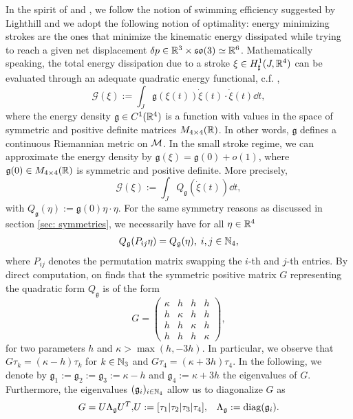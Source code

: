 \label{sec: optimization}
In the spirit of \cite{Alouges2013} and \cite{Alouges2017}, we follow the notion of swimming efficiency suggested by Lighthill \cite{Lighthill1952} and we adopt the following notion of optimality: energy minimizing strokes are the ones that minimize the kinematic energy dissipated while trying to reach a given net displacement $\delta p \in \mathbb{R}^3 \times \mathfrak{so}(3) \simeq \mathbb{R}^6$. Mathematically speaking, the total energy dissipation due to a stroke $\xi \in H^1_{\sharp}(J, \mathbb{R}^4)$ can be evaluated through an adequate quadratic energy functional, c.f. \cite{Alouges2013},
\begin{equation}
 \mathcal{G}(\xi) := \int_{J} \mathfrak{g}(\xi(t))\dot{\xi}(t) \cdot \dot{\xi}(t) \dd t,
\end{equation}
where the energy density $\mathfrak{g} \in C^1(\mathbb{R}^4)$ is a function with values in the space of symmetric and positive definite matrices $M_{4 \times 4}(\mathbb{R})$. In other words, $\mathfrak{g}$ defines a continuous Riemannian metric on $\mathcal{M}$. In the small stroke regime, we can approximate the energy density by $\mathfrak{g}(\xi) = \mathfrak{g}(0) + o(1)$, where $\mathfrak{g}(0) \in M_{4 \times 4}(\mathbb{R})$ is symmetric and positive definite. More precisely,
\begin{equation}
\label{eq: linearized energy functional}
	\mathcal{G}(\xi) := \int_{J} Q_{\mathfrak{g}}(\dot{\xi}(t))\dd t,
\end{equation}
with $Q_{\mathfrak{g}}(\eta) := \mathfrak{g}(0)\eta \cdot \eta$. For the same symmetry reasons as discussed in section \ref{sec: symmetries}, we necessarily have for all $\eta \in \mathbb{R}^4$
\begin{align}
	Q_{\mathfrak{g}}(P_{ij} \eta) = Q_{\mathfrak{g}}(\eta),\; i,j \in \mathbb{N}_4,
\end{align}
where $P_{ij}$ denotes the permutation matrix swapping the $i$-th and $j$-th entries. By direct computation, on finds that the symmetric positive matrix $G$ representing the quadratic form $Q_{\mathfrak{g}}$ is of the form
\begin{equation}
G = \left ( \begin{array}{cccc}
\kappa & h & h & h \\ 
h & \kappa & h & h \\ 
h & h & \kappa & h \\ 
h & h & h & \kappa
\end{array} \right ),
\end{equation}
for two parameters $h$ and $\kappa > \max(h, -3h)$. In particular, we observe that $G \tau_k = (\kappa - h ) \tau_k$ for $k \in  \mathbb{N}_3$ and $G \tau_4 = (\kappa + 3h) \tau_4$. In the following, we denote by $\mathfrak{g}_1 := \mathfrak{g}_2 := \mathfrak{g}_3 := \kappa - h$ and $\mathfrak{g}_4 := \kappa + 3h$ the eigenvalues of $G$. Furthermore, the eigenvalues $(\mathfrak{g}_i)_{i \in \mathbb{N}_4}$ allow us to diagonalize  $G$ as
\begin{eqnarray}
G = U \Lambda_{\mathfrak{g}} U^T, & U := [\tau_1 | \tau_2 |\tau_3 |\tau_4], & \Lambda_{\mathfrak{g}} := \operatorname{diag}(\mathfrak{g}_i).
\end{eqnarray}

